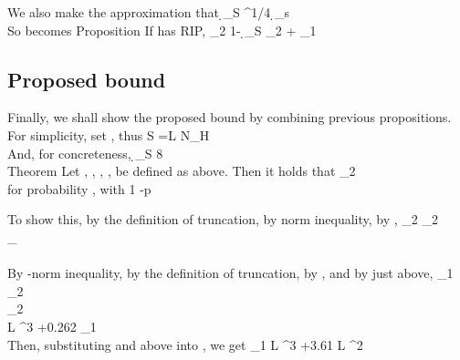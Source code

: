 We also make the approximation that
%
 {
\d_{S}
\leq {}  ^{1/4} \d_{s} \\
}
%
So  becomes
%
\Result
{Proposition}
{
If  has  RIP,
%
 {
 _2
\leq {} {1-  \d_{S}}  _2
+  { }  _1 \\
}
}


\subsection {Proposed bound}

Finally, we shall show the proposed bound by combining previous propositions.
For simplicity, set , thus
%
 {
S
=L \log N_H \\
}
%
And, for concreteness,
%
 {
\d_S
\leq {} {8} \\
}
%
\Result
{Theorem}
{
Let , , , ,  be defined as above.
Then it holds that
%
 {
 _2
\eqsim {}  \\
}
%
for probability , with
%
 {
1 -p
\eqsim {}  \\
}
}

To show this, by the definition of truncation, by  norm inequality, by ,
%
 {
 _2
\leq {} _2 \\
%
\leq {}  _\infty \\
%
  \\
}
%
By -norm inequality, by the definition of truncation, by , and by  just above,
%
 {
 _1
\leq {}  _2 \\
%
\leq {}  _2 \\
%
 L ^3
+0.262  _1 \\
}
%
Then, substituting  and  above into , we get
 {
 _1
%
 L ^3 +3.61 L ^2 \\
}

